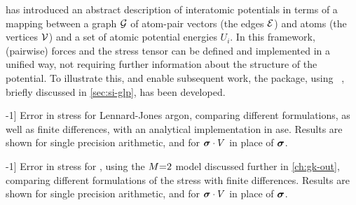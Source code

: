  has introduced an abstract description of interatomic potentials in terms of a mapping between a graph $\mathcal{G}$ of atom-pair vectors (the edges $\mathcal{E}$) and atoms (the vertices $\mathcal{V}$) and a set of atomic potential energies $U_i$. In this framework, (pairwise) forces and the stress tensor can be defined and implemented in a unified way, not requiring further information about the structure of the potential. To illustrate this, and enable subsequent work, the \glpc package, using \jax~\cite{jax}, briefly discussed in \cref{sec:si-glp}, has been developed.

\begin{table}
    \caption[][-1\baselineskip]{
    Error in stress for Lennard-Jones argon,
    comparing different formulations, as well as finite differences, with an analytical implementation in \gls{ase}.
    Results are shown for single precision arithmetic, and for $\boldsymbol{\sigma} \cdot V$ in place of $\boldsymbol{\sigma}$.
    }
    
    \label{tab:glps_lj_stress_error_32}
\end{table}

\begin{table}
    \caption[][-1\baselineskip]{
    Error in stress for , using the $M{=}2$ \sok model discussed further in \cref{ch:gk-out},
    comparing different formulations of the stress with finite differences.
    Results are shown for single precision arithmetic, and for $\boldsymbol{\sigma} \cdot V$ in place of $\boldsymbol{\sigma}$.
    }
    
    \label{tab:glps_snse_stress_error_32}
\end{table}
